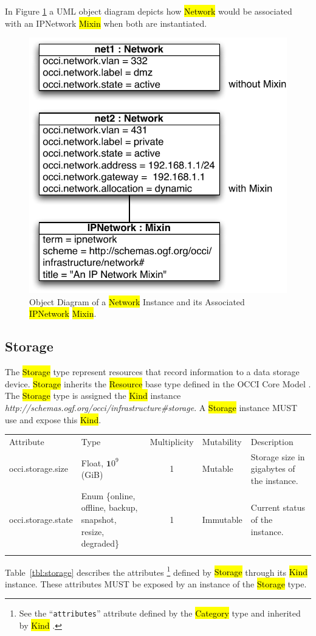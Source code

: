 \documentclass[10pt,a4paper]{article}
\begin{document}
In Figure \ref{fig:network_mixin} a UML object diagram depicts how \hl{Network} would be associated with an 
IPNetwork \hl{Mixin} when both are instantiated.

\begin{figure}[!h]
	\centering
	\includegraphics[scale=0.5]{figs/infrastructure_mixins_obj_dia1_network}
	\caption{Object Diagram of a \hl{Network} Instance and its 
	Associated \hl{IPNetwork} \hl{Mixin}.}
	\label{fig:network_mixin}
\end{figure}

\subsection{Storage}
The \hl{Storage} type represent resources that record information to a data storage device. 
\hl{Storage} inherits the \hl{Resource} base type defined in the OCCI Core Model \cite{occi:core}.
The \hl{Storage} type is assigned the \hl{Kind} instance \textit{http://schemas.ogf.org/occi/infrastructure\#storage}.
A \hl{Storage} instance MUST use and expose this \hl{Kind}.

{
	\begin{tabular}{lp{2.8cm}clp{5cm}}
	\toprule
	Attribute&Type&Multi\-plicity&Mutability&Description\\
	\colrule
	occi.storage.size & Float, ${\mathbf 10}^9$ (GiB) & 1 & Mutable 
	& Storage size in gigabytes of the 	instance.\\
	occi.storage.state & Enum \{online, offline, backup, snapshot, resize, degraded\} & 1 & Immutable 
	& Current status of the instance.\\
	\botrule
	\end{tabular}
}
Table~\ref{tbl:storage} describes the attributes%
\footnote{See the ``{\tt attributes}'' attribute defined by the \hl{Category}
type and inherited by \hl{Kind} \cite{occi:core}.} 
defined by \hl{Storage} through its \hl{Kind} instance. These attributes
MUST be exposed by an instance of the \hl{Storage} type.
\end{document}
